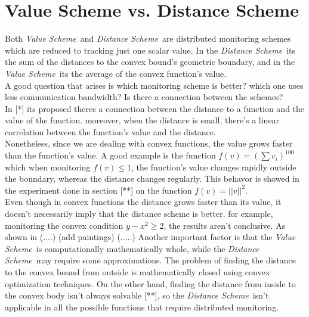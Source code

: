 \documentclass[10pt, conference]{IEEEtran}
\newcommand{\valueScheme}{\textit{Value Scheme}}
\newcommand{\distanceScheme}{\textit{Distance Scheme}}
\begin{document}
\section{Value Scheme vs. Distance Scheme}
Both \valueScheme \ and \distanceScheme \ are distributed monitoring schemes which are reduced to tracking just one scalar value. In the \distanceScheme \ its the sum of the distances to the convex bound's geometric boundary, and in the \valueScheme \ its the average of the convex function's value. \\
A good question that arises is which monitoring scheme is better? which one uses less communication bandwidth? Is there a connection between the schemes? \\
In [*] its proposed theres a connection between the distance to a function and the value of the function. moreover, when the distance is small, there's a linear correlation between the function's value and the distance. \\
Nonetheless, since we are dealing with convex functions, the value grows faster than the function's value. A good example is the function ${f(v) = (\sum v_i)^{100}}$ which  when monitoring ${f(v) \leq 1}$, the function's value changes rapidly outside the boundary, whereas the distance changes regularly.
This behavor is showed in the experiment done in section [**] on the function ${f(v) = ||v||^2}$. \\
Even though in convex functions the distance grows faster than its value, it doesn't necessarily imply that the distance scheme is better. for example, monitoring the convex condition $y-x^2 \geq 2$, the results aren't conclusive. As shown in (....) (add paintings)
(.....)
Another important factor is that the \valueScheme \ is computationally mathematically whole, while the \distanceScheme \ may require some approximations. The problem of finding the distance to the convex bound from outside is mathematically closed using convex optimization techniques. On the other hand, finding the distance from inside to the convex body isn't always solvable [**], so the \distanceScheme \ isn't applicable in all the possible functions that require distributed monitoring.
\end{document}
